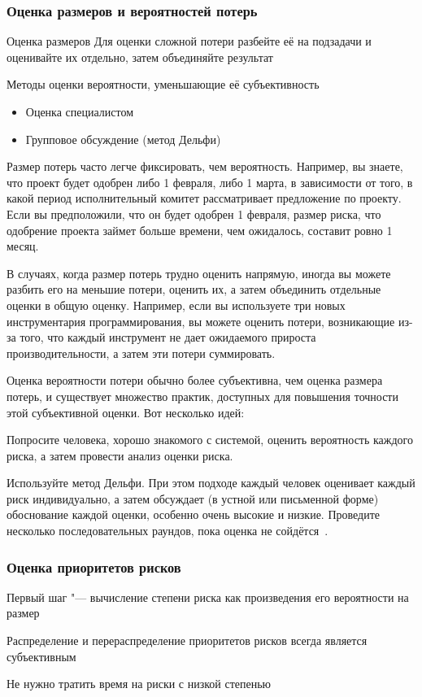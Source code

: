 \documentclass{../industrial-development}
\begin{document}
\begin{frame} \frametitle{Оценка размеров и вероятностей потерь}
	\begin{block}{Оценка размеров}
		Для оценки сложной потери разбейте её на подзадачи и оценивайте их отдельно, затем объединяйте результат
	\end{block}
	
	\begin{block}{Методы оценки вероятности, уменьшающие её субъективность}
		\begin{itemize}
			\item Оценка специалистом
			\item Групповое обсуждение (метод Дельфи)
		\end{itemize}
	\end{block}
\end{frame}

\lecturenotes

Размер потерь часто легче фиксировать, чем вероятность. Например, вы знаете, что проект будет одобрен либо 1 февраля, либо 1 марта, в зависимости от того, в какой период исполнительный комитет рассматривает предложение по проекту. Если вы предположили, что он будет одобрен 1 февраля, размер риска, что одобрение проекта займет больше времени, чем ожидалось, составит ровно 1 месяц.

В случаях, когда размер потерь трудно оценить напрямую, иногда вы можете разбить его на меньшие потери, оценить их, а затем объединить отдельные оценки в общую оценку. Например, если вы используете три новых инструментария программирования, вы можете оценить потери, возникающие из-за того, что каждый инструмент не дает ожидаемого прироста производительности, а затем эти потери суммировать.

Оценка вероятности потери обычно более субъективна, чем оценка размера потерь, и существует множество практик, доступных для повышения точности этой субъективной оценки. Вот несколько идей:

Попросите человека, хорошо знакомого с системой, оценить вероятность каждого риска, а затем провести анализ оценки риска.

Используйте метод Дельфи. При этом подходе каждый человек оценивает каждый риск индивидуально, а затем обсуждает (в устной или письменной форме) обоснование каждой оценки, особенно очень высокие и низкие. Проведите несколько последовательных раундов, пока оценка не сойдётся~\cite[с.~84]{McConnell}.

\begin{frame} \frametitle{Оценка приоритетов рисков}
	\begin{block}{}
		Первый шаг "--- вычисление степени риска как произведения его вероятности на размер
	\end{block}
	
	\begin{block}{}
		Распределение и перераспределение приоритетов рисков всегда является субъективным
	\end{block}
	
	\begin{block}{}
		Не нужно тратить время на риски с низкой степенью
	\end{block}
\end{frame}
\end{document}

